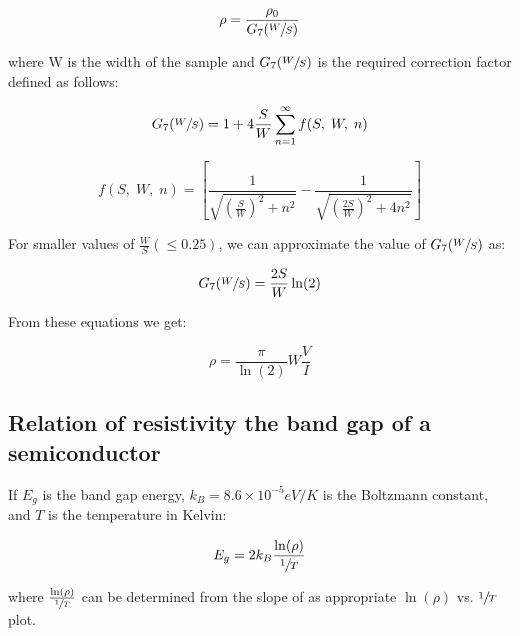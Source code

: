 		$$\rho = \frac{\rho_0}{G_7(\sfrac{W}{S})}$$

		where W is the width of the sample and $G_7(\sfrac{W}{S})$ is the required correction factor defined as follows:

		$$G_7(\sfrac{W}{S}) = 1 + 4 \frac{S}{W}\sum_{n=1}^{\infty} f(S,\;W,\;n) $$

		$$f(S,\;W,\;n) = \left[\frac{1}{\sqrt{\left(\frac{S}{W}\right)^2+n^2}} - \frac{1}{\sqrt{\left(\frac{2S}{W}\right)^2+4n^2}}\right]$$

		For smaller values of $\frac{W}{S} (\le 0.25)$, we can approximate the value of $G_7(\sfrac{W}{S})$ as:

		$$G_7(\sfrac{W}{S}) = \frac{2S}{W}\ln(2)$$

		From these equations we get:

		\begin{equation}
			\rho = \frac{\pi}{\ln(2)}W\frac{V}{I}
			\label{eq:2}
		\end{equation}

	\subsection{Relation of resistivity the band gap of a
	semiconductor}

		If $E_g$ is the band gap energy, $k_B = 8.6\times 10^{-5} eV/K$ is the Boltzmann constant, and $T$ is the temperature in Kelvin:

		\begin{equation}
			E_g = 2k_B\frac{\ln(\rho)}{\sfrac{1}{T}}
			\label{eq:3}
		\end{equation}

		where $\frac{\ln(\rho)}{\sfrac{1}{T}}$ can be determined from the slope of as appropriate $\ln(\rho)$ vs. $\sfrac{1}{T}$ plot.